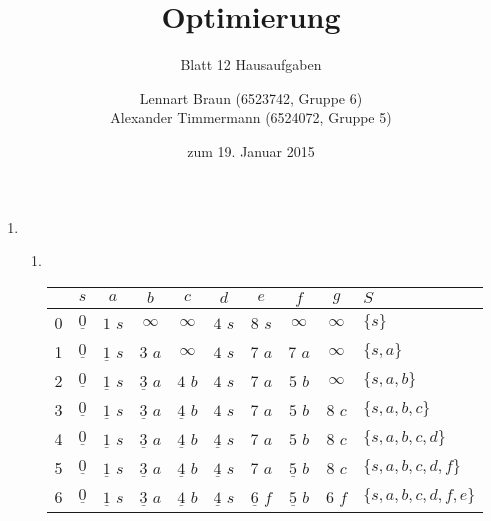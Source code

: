 \documentclass[a4paper]{scrartcl}
\title{Optimierung}
\subtitle{Blatt 12 Hausaufgaben}
\author{
	Lennart Braun (6523742, Gruppe 6) \\
    Alexander Timmermann (6524072, Gruppe 5)
}
\date{zum 19. Januar 2015}
\begin{document}
\maketitle

\begin{enumerate}[label=\bfseries\arabic*.]
    \item
        \begin{enumerate}
            \item \hfill \\
                \begin{table}[h]
                    \centering
                    \begin{tabular}{c||c|c|c|c|c|c|c|c||l}
                        & $s$ & $a$ & $b$ & $c$ & $d$ & $e$ & $f$ & $g$ & $S$
                        \\ \hline \hline
                        0 & $\underline{0}$ & $1$ $s$ & $\infty$ & $\infty$ & $4$ $s$ & $8$ $s$ & $\infty$ & $\infty$ & $\{ s \}$
                        \\ \hline
                        1 & $\underline{0}$ & $\underline{1}$ $s$ & $3$ $a$ & $\infty$ & $4$ $s$ & $7$ $a$ & $7$ $a$ & $\infty$ & $\{ s, a \}$
                        \\ \hline
                        2 & $\underline{0}$ & $\underline{1}$ $s$ & $\underline{3}$ $a$ & $4$ $b$ & $4$ $s$ & $7$ $a$ & $5$ $b$ & $\infty$ & $\{ s, a, b \}$
                        \\ \hline
                        3 & $\underline{0}$ & $\underline{1}$ $s$ & $\underline{3}$ $a$ & $\underline{4}$ $b$ & $4$ $s$ & $7$ $a$ & $5$ $b$ & $8$ $c$ & $\{ s, a, b, c \}$
                        \\ \hline
                        4 & $\underline{0}$ & $\underline{1}$ $s$ & $\underline{3}$ $a$ & $\underline{4}$ $b$ & $\underline{4}$ $s$ & $7$ $a$ & $5$ $b$ & $8$ $c$ & $\{ s, a, b, c, d \}$
                        \\ \hline
                        5 & $\underline{0}$ & $\underline{1}$ $s$ & $\underline{3}$ $a$ & $\underline{4}$ $b$ & $\underline{4}$ $s$ & $7$ $a$ & $\underline{5}$ $b$ & $8$ $c$ & $\{ s, a, b, c, d, f \}$
                        \\ \hline
                        6 & $\underline{0}$ & $\underline{1}$ $s$ & $\underline{3}$ $a$ & $\underline{4}$ $b$ & $\underline{4}$ $s$ & $\underline{6}$ $f$ & $\underline{5}$ $b$ & $6$ $f$ & $\{ s, a, b, c, d, f, e \}$
                        \\ \hline

\end{tabular}
\end{table}
\end{enumerate}
\end{enumerate}
\end{document}
